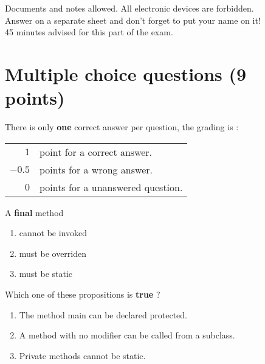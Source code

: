 \documentclass[correction]{exercices}
\begin{document}

\begin{center}
Documents and notes allowed. All electronic devices are forbidden.
\\Answer on a separate sheet and don't forget to put your name on it!
\\45 minutes advised for this part of the exam.
\end{center}

\section{Multiple choice questions (9 points)}

  There is only \textbf{one} correct answer per question, the grading is :
  
  \begin{tabular}{rl}
  $1$    &point for a correct answer.\\ 
  $-0.5$ &points for a wrong answer.\\
  $0$    &points for a unanswered question.\\
  \end{tabular}
\vspace{1cm}

\begin{question}
A \textbf{final} method
\begin{multicols}{2}
\begin{enumerate}
\item cannot be invoked 
\item must be overriden
\item must be static
\end{enumerate}
\end{multicols}
\end{question}

\begin{question}
Which one of these propositions is \textbf{true} ?
\begin{enumerate}
\item The method main can be declared protected. 
\item A method with no modifier can be called from a subclass.
\item Private methods cannot be static.
\end{enumerate}
\end{question}
\end{document}
